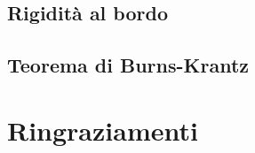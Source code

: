 \documentclass{article}
\begin{document}
\subsection{Rigidità al bordo}


\subsection{Teorema di Burns-Krantz}


\newpage



\section*{Ringraziamenti}

\end{document}
